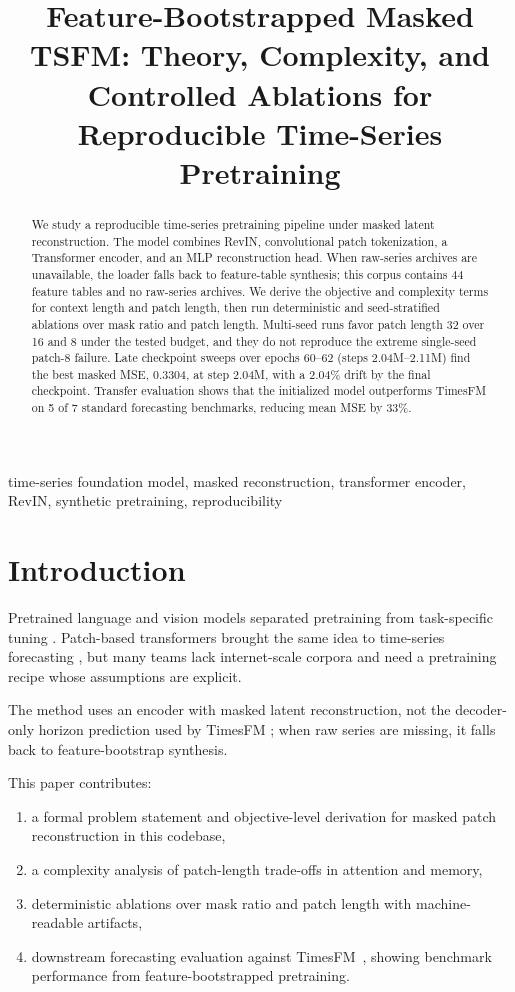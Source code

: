 \documentclass[journal]{IEEEtran}
\title{Feature-Bootstrapped Masked TSFM: Theory, Complexity, and Controlled Ablations for Reproducible Time-Series Pretraining}
\author{
  \IEEEauthorblockN{Author~One\IEEEauthorrefmark{1}, Author~Two\IEEEauthorrefmark{1}, Author~Three\IEEEauthorrefmark{1}}
  \IEEEauthorblockA{\IEEEauthorrefmark{1}Department of Computer Science and Engineering,\\
  University Name, City, Country\\
  \{author1, author2, author3\}@university.edu}
}
\begin{document}
\maketitle

\begin{abstract}
We study a reproducible time-series pretraining pipeline under masked latent reconstruction. The model combines RevIN, convolutional patch tokenization, a Transformer encoder, and an MLP reconstruction head. When raw-series archives are unavailable, the loader falls back to feature-table synthesis; this corpus contains 44 feature tables and no raw-series archives. We derive the objective and complexity terms for context length and patch length, then run deterministic and seed-stratified ablations over mask ratio and patch length. Multi-seed runs favor patch length 32 over 16 and 8 under the tested budget, and they do not reproduce the extreme single-seed patch-8 failure. Late checkpoint sweeps over epochs 60--62 (steps 2.04M--2.11M) find the best masked MSE, 0.3304, at step 2.04M, with a 2.04\% drift by the final checkpoint. Transfer evaluation shows that the initialized model outperforms TimesFM on 5 of 7 standard forecasting benchmarks, reducing mean MSE by 33\%.
\end{abstract}

\begin{IEEEkeywords}
time-series foundation model, masked reconstruction, transformer encoder, RevIN, synthetic pretraining, reproducibility
\end{IEEEkeywords}

\section{Introduction}
Pretrained language and vision models separated pretraining from task-specific tuning \cite{brown2020gpt3,devlin2019bert,dosovitskiy2021vit,he2022mae}. Patch-based transformers brought the same idea to time-series forecasting \cite{timesfm,patchtst,informer,autoformer,fedformer}, but many teams lack internet-scale corpora and need a pretraining recipe whose assumptions are explicit.

The method uses an encoder with masked latent reconstruction, not the decoder-only horizon prediction used by TimesFM \cite{timesfm}; when raw series are missing, it falls back to feature-bootstrap synthesis.

This paper contributes:
\begin{enumerate}
    \item a formal problem statement and objective-level derivation for masked patch reconstruction in this codebase,
    \item a complexity analysis of patch-length trade-offs in attention and memory,
    \item deterministic ablations over mask ratio and patch length with machine-readable artifacts,
    \item downstream forecasting evaluation against TimesFM~\cite{timesfm}, showing benchmark performance from feature-bootstrapped pretraining.
\end{enumerate}
\end{document}
